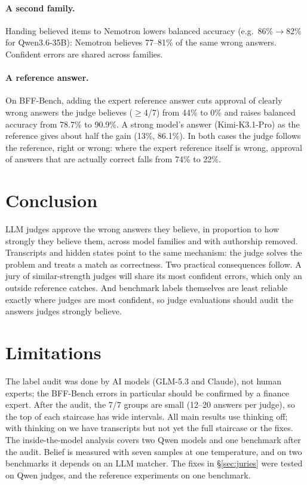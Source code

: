 \documentclass[11pt]{article}
\begin{document}
\paragraph{A second family.}
Handing believed items to Nemotron lowers balanced accuracy (e.g.\ 86\%$\rightarrow$82\% for Qwen3.6-35B): Nemotron
believes 77--81\% of the same wrong answers. Confident errors are shared across families.

\paragraph{A reference answer.}
On BFF-Bench, adding the expert reference answer \citep{krumdick2026nofreelabels} cuts approval of clearly wrong
answers the judge believes ($\geq$4/7) from 44\% to 0\% and raises balanced accuracy from 78.7\% to 90.9\%. A strong
model's answer (Kimi-K3.1-Pro) as the reference gives about half the gain (13\%, 86.1\%). In both cases the judge
follows the reference, right or wrong: where the expert reference itself is wrong, approval of answers that are
actually correct falls from 74\% to 22\%.

\section{Conclusion}

LLM judges approve the wrong answers they believe, in proportion to how strongly they believe them, across model
families and with authorship removed. Transcripts and hidden states point to the same mechanism: the judge solves
the problem and treats a match as correctness. Two practical consequences follow. A jury of similar-strength judges
will share its most confident errors, which only an outside reference catches. And benchmark labels themselves are
least reliable exactly where judges are most confident, so judge evaluations should audit the answers judges
strongly believe.

\section*{Limitations}

The label audit was done by AI models (GLM-5.3 and Claude), not human experts; the BFF-Bench errors in particular
should be confirmed by a finance expert. After the audit, the 7/7 groups are small (12--20 answers per judge), so the
top of each staircase has wide intervals. All main results use thinking off; with thinking on we have transcripts
but not yet the full staircase or the fixes. The inside-the-model analysis covers two Qwen models and one benchmark
after the audit. Belief is measured with seven samples at one temperature, and on two benchmarks it depends on an
LLM matcher. The fixes in \S\ref{sec:juries} were tested on Qwen judges, and the reference experiments on one
benchmark.
\end{document}
